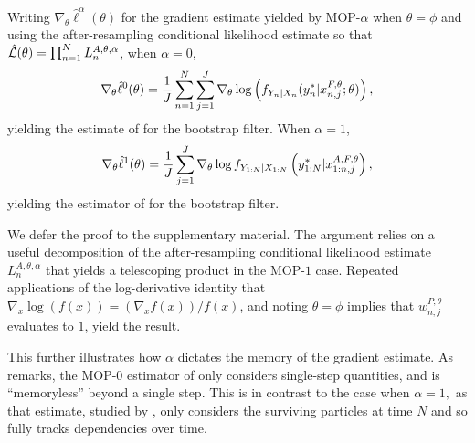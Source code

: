 \documentclass[9pt,twocolumn,pnasresearcharticle]{pnas-new}
\newcommand\arxiv[2]{#2} %
\begin{document}
\begin{thm}
    \label{thm:mop-functional-forms}
    Writing $\nabla_\theta \hat\ell^\alpha(\theta)$ for the gradient estimate yielded by MOP-$\alpha$ when $\theta=\phi$ and using the after-resampling conditional likelihood estimate so that $\hat{\mathcal{L}}(\theta) = \prod_{n=1}^N L_n^{A, \theta, \alpha}$, when $\alpha=0$,
    \vspace*{-2.5mm}
    \begin{equation} \nonumber
        \nabla_\theta \hat\ell^0(\theta) 
        = \frac{1}{J} \sum_{n=1}^N \sum_{j=1}^J \nabla_\theta \log\left(f_{Y_n|X_{n}}(y_n^*|x_{n,j}^{F, \theta}; \theta)\right),
        \vspace*{-2.5mm}
    \end{equation}
    yielding the estimate of \cite{naesseth18} for the bootstrap filter. When $\alpha=1$,
    \vspace*{-2.5mm}
    \begin{equation} \nonumber
        \nabla_\theta \hat{\ell}^1(\theta) 
        = \frac{1}{J}\sum_{j=1}^J \nabla_\theta \log f_{Y_{1:N}|X_{1:N}}\left(y_{1:N}^* | x_{1:n,j}^{A, F,\theta}\right),
    \vspace*{-2.5mm}
    \end{equation}
    yielding the estimator of \cite{poyiadjis11, scibior21} for the bootstrap filter.
\end{thm}

We defer the proof to \arxiv{Appendix~\ref{appendix:functional}}{the supplementary material}. 
The argument relies on a useful decomposition of the after-resampling conditional likelihood estimate $L_n^{A,\theta,\alpha}$ that yields a telescoping product in the MOP-$1$ case. 
Repeated applications of the log-derivative identity that $\nabla_x \log(f(x)) = (\nabla_x f(x))/f(x)$, and noting $\theta=\phi$ implies that $w_{n,j}^{P,\theta}$ evaluates to $1$, yield the result. 

This further illustrates how $\alpha$ dictates the memory of the gradient estimate. 
As \cite{scibior21} remarks, the MOP-$0$ estimator of \cite{naesseth18} only considers single-step quantities, and is ``memoryless'' beyond a single step. 
This is in contrast to the case when $\alpha=1,$ as that estimate, studied by \cite{poyiadjis11}, only considers the surviving particles at time $N$ and so fully tracks dependencies over time. 
\end{document}
